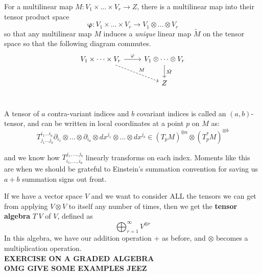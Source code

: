 	\begin{prop}
		For a multilinear map $M: V_1 \times \dots \times V_r \rightarrow Z$, there is a multilinear map into their tensor product space
		\begin{equation}
			\mathbf \varphi: V_1 \times \dots \times V_r \rightarrow V_1 \otimes \dots \otimes V_r
		\end{equation}
		so that any multilinear map $M$ induces a \emph{unique} linear map $\tilde M$ on the tensor space so that the following diagram commutes. 
		\[ 
		\begin{tikzcd}
		V_1 \times \dots \times V_r \arrow{r}{\varphi} \arrow[dashrightarrow]{rd}{M} & V_1 \otimes \dots \otimes V_r \arrow{d}{\tilde M} \\
		  & Z \\
		\end{tikzcd}
		\]
	\end{prop}
	
	
	
	\begin{defn}[An $(a,b)$-Tensor]
		A tensor of $a$ contra-variant indices and $b$ covariant indices is called an $(a,b)$-tensor, and can be written in local coordinates at a point $p$ on $M$ as:
		\begin{equation*}
			T_{j_1 \dots j_b}^{i_1 \dots i_a}  \partial_{i_1} \otimes \dots \otimes \partial_{i_a} \otimes dx^{j_1} \otimes \dots \otimes dx^{j_b}  \in (T_p M)^{\otimes a} \otimes (T_p^* M)^{\otimes b} 
		\end{equation*}
	\end{defn}
	and we know how $T_{i_1, \dots, i_a}^{j_1, \dots, j_b}$ linearly transforms on each index. Moments like this are when we should be grateful to Einstein's summation convention for saving us $a+b$ summation signs out front. 
	
	If we have a vector space $V$ and we want to consider ALL the tensors we can get from applying $V \otimes V$ to itself any number of times, then we get the \textbf{tensor algebra} $T^\cdot V$ of $V$, defined as
	\begin{equation}
		\bigoplus_{r=1}^\infty V^{\otimes r}
	\end{equation}
	In this algebra, we have our addition operation $+$ as before, and $\otimes$ becomes a multiplication operation.\\
	\textbf{EXERCISE ON A GRADED ALGEBRA}\\
	\textbf{OMG GIVE SOME EXAMPLES JEEZ}

